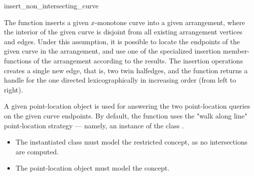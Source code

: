\ccRefPageBegin

\begin{ccRefFunction}{insert_non_intersecting_curve}

\ccDefinition

The function \ccRefName{} inserts a given $x$-monotone curve into a given
arrangement, where the interior of the given curve is disjoint from all
existing arrangement vertices and edges. Under this assumption, it is
possible to locate the endpoints of the given curve in the arrangement,
and use one of the specialized insertion member-functions of the
arrangement according to the results. The insertion operations creates a
single new edge, that is, two twin halfedges, and the function returns a
handle for the one directed lexicographically in increasing order (from
left to right).

A given point-location object is used for answering the two point-location
queries on the given curve endpoints. By default, the function uses the
"walk along line" point-location strategy --- namely, an instance of the
class .



\ccRequirements
\begin{itemize}
\item The instantiated  class must model the restricted
   concept, as no intersections are computed.
\item The point-location object  must model the
   concept. 
\end{itemize}

\end{ccRefFunction}

\ccRefPageEnd

